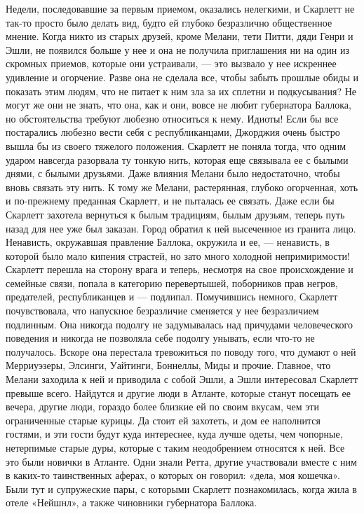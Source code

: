 Недели, последовавшие за первым приемом, оказались нелегкими, и Скарлетт не так-то просто было делать вид, будто ей глубоко безразлично общественное мнение. Когда никто из старых друзей, кроме Мелани, тети Питти, дяди Генри и Эшли, не появился больше у нее и она не получила приглашения ни на один из скромных приемов, которые они устраивали, — это вызвало у нее искреннее удивление и огорчение. Разве она не сделала все, чтобы забыть прошлые обиды и показать этим людям, что не питает к ним зла за их сплетни и подкусывания? Не могут же они не знать, что она, как и они, вовсе не любит губернатора Баллока, но обстоятельства требуют любезно относиться к нему. Идиоты! Если бы все постарались любезно вести себя с республиканцами, Джорджия очень быстро вышла бы из своего тяжелого положения.
Скарлетт не поняла тогда, что одним ударом навсегда разорвала ту тонкую нить, которая еще связывала ее с былыми днями, с былыми друзьями. Даже влияния Мелани было недостаточно, чтобы вновь связать эту нить. К тому же Мелани, растерянная, глубоко огорченная, хоть и по-прежнему преданная Скарлетт, и не пыталась ее связать. Даже если бы Скарлетт захотела вернуться к былым традициям, былым друзьям, теперь путь назад для нее уже был заказан. Город обратил к ней высеченное из гранита лицо. Ненависть, окружавшая правление Баллока, окружила и ее, — ненависть, в которой было мало кипения страстей, но зато много холодной непримиримости! Скарлетт перешла на сторону врага и теперь, несмотря на свое происхождение и семейные связи, попала в категорию перевертышей, поборников прав негров, предателей, республиканцев и — подлипал.
Помучившись немного, Скарлетт почувствовала, что напускное безразличие сменяется у нее безразличием подлинным. Она никогда подолгу не задумывалась над причудами человеческого поведения и никогда не позволяла себе подолгу унывать, если что-то не получалось. Вскоре она перестала тревожиться по поводу того, что думают о ней Мерриуэзеры, Элсинги, Уайтинги, Боннеллы, Миды и прочие. Главное, что Мелани заходила к ней и приводила с собой Эшли, а Эшли интересовал Скарлетт превыше всего. Найдутся и другие люди в Атланте, которые станут посещать ее вечера, другие люди, гораздо более близкие ей по своим вкусам, чем эти ограниченные старые курицы. Да стоит ей захотеть, и дом ее наполнится гостями, и эти гости будут куда интереснее, куда лучше одеты, чем чопорные, нетерпимые старые дуры, которые с таким неодобрением относятся к ней.
Все это были новички в Атланте. Одни знали Ретта, другие участвовали вместе с ним в каких-то таинственных аферах, о которых он говорил: «дела, моя кошечка». Были тут и супружеские пары, с которыми Скарлетт познакомилась, когда жила в отеле «Нейшнл», а также чиновники губернатора Баллока.
